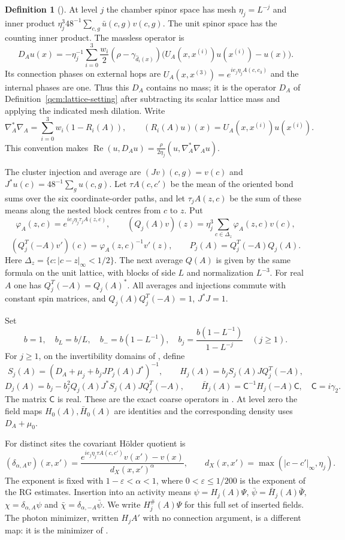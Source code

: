 \documentclass[11pt,letterpaper,reqno]{amsart}
\theoremstyle{definition}
\newtheorem{qcmdefinition}[qcmproposition]{Definition}
\newenvironment{definition}[1][]{\pushQED{\qed}\renewcommand{\qedsymbol}{$\blacksquare$}\begin{qcmdefinition}[#1]}{\popQED\end{qcmdefinition}}
\begin{document}
\begin{definition}\label{qcm:rg-operators}
At level $j$ the chamber spinor space has mesh
$\eta_j=L^{-j}$ and inner product
$\eta_j^3 48^{-1}\sum_{c,g}\bar u(c,g)v(c,g)$.
The unit spinor space has the counting inner product.
The massless operator is
\[
 D_Au(x)=-\eta_j^{-1}\sum_{i=0}^3
       \frac{w_i}{2}(\rho-\gamma_{\widehat d_i(x)})
           \bigl(U_A(x,x^{(i)})u(x^{(i)})-u(x)\bigr).
\]
Its connection phases on external hops are
$U_A(x,x^{(3)})=e^{ie_j\eta_j A(c,c_3)}$ and the internal
phases are one. Thus this $D_A$ contains no mass; it is the
operator $D_A$ of Definition~\ref{qcm:lattice-setting} after
subtracting its scalar lattice mass and applying the indicated
mesh dilation. Write
\[
 \nabla_A^*\nabla_A=
       \sum_{i=0}^3w_i(1-R_i(A)),\qquad
 (R_i(A)u)(x)=U_A(x,x^{(i)})u(x^{(i)}).
\]
This convention makes
$\operatorname{Re}(u,D_Au)=\frac\rho{2\eta_j}
 (u,\nabla_A^*\nabla_Au)$.

The cluster injection and average are
$(Jv)(c,g)=v(c)$ and $J^*u(c)=48^{-1}\sum_gu(c,g)$.
Let $\tau A(c,c')$ be the mean of the oriented bond sums
over the six coordinate-order paths, and let
$\tau_j A(z,c)$ be the sum of these means along the nested
block centres from $c$ to $z$. Put
\[
 \varphi_A(z,c)=e^{ie_j\eta_j\tau_j A(z,c)},\qquad
 (Q_j(A)v)(z)=\eta_j^3\sum_{c\in\Delta_z}\varphi_A(z,c)v(c),
\]
\[
 (Q_j^T(-A)v')(c)=\varphi_A(z,c)^{-1}v'(z),\qquad
 P_j(A)=Q_j^T(-A)Q_j(A).
\]
Here $\Delta_z=\{c:|c-z|_\infty<1/2\}$.
The next average $Q(A)$ is given by the same formula on
the unit lattice, with blocks of side $L$ and normalization
$L^{-3}$. For real $A$ one has $Q_j^T(-A)=Q_j(A)^*$.
All averages and injections commute with constant spin matrices,
and $Q_j(A)Q_j^T(-A)=1$, $J^*J=1$.

Set
\[
 b=1,\quad b_L=b/L,\quad b_-=b(1-L^{-1}),\quad
 b_j=\frac{b(1-L^{-1})}{1-L^{-j}}\quad(j\ge1).
\]
For $j\ge1$, on the invertibility domains of
\cite[Sections~9 and~11]{QEDConstruction}, define
\[
 S_j(A)=(D_A+\mu_j+b_jJP_j(A)J^*)^{-1},\qquad
 H_j(A)=b_jS_j(A)JQ_j^T(-A),
\]
\[
 D_j(A)=b_j-b_j^2Q_j(A)J^*S_j(A)JQ_j^T(-A),\qquad
 \bar H_j(A)=\mathsf C^{-1}H_j(-A)\mathsf C,
 \quad \mathsf C=i\gamma_2.
\]
The matrix $\mathsf C$ is real. These are the exact coarse
operators in \cite[Section~11.2, equations~(11.8)--(11.9)]{QEDConstruction}.
At level zero the field maps $H_0(A),\bar H_0(A)$ are identities
and the corresponding density uses $D_A+\mu_0$.

For distinct sites the covariant H\"older quotient is
\[
 (\delta_{\alpha,A}v)(x,x')=
  \frac{e^{ie_j\eta_j\tau A(c,c')}v(x')-v(x)}
       {d_X(x,x')^\alpha},\qquad
 d_X(x,x')=\max(|c-c'|_\infty,\eta_j).
\]
The exponent is fixed with $1-\varepsilon<\alpha<1$,
where $0<\varepsilon\le1/200$ is the exponent of the RG estimates.
Insertion into an activity means
$\psi=H_j(A)\Psi$, $\bar\psi=\bar H_j(A)\bar\Psi$,
$\chi=\delta_{\alpha,A}\psi$ and
$\bar\chi=\delta_{\alpha,-A}\bar\psi$.
We write $H_j^\#(A)\Psi$ for this full set of inserted fields.
The photon minimizer, written $H_jA'$ with no connection
argument, is a different map: it is the minimizer of
\cite[Proposition~10.1]{QEDConstruction}.
\end{definition}
\end{document}
